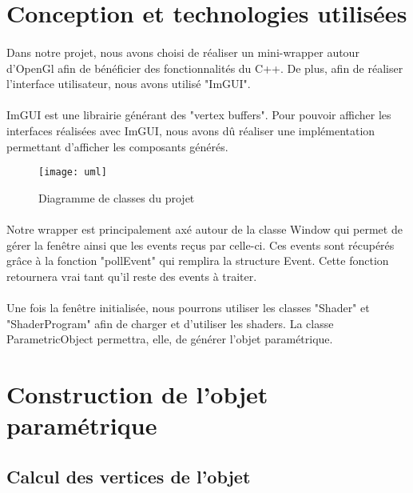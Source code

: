 \documentclass[article, backcover, french, nodocumentinfo]{upmethodology-document}
\begin{document}
	\section{Conception et technologies utilisées}
		\paragraph*{}
			Dans notre projet, nous avons choisi de réaliser un mini-wrapper autour d'OpenGl afin de bénéficier des fonctionnalités du C++.
			De plus, afin de réaliser l'interface utilisateur, nous avons utilisé "ImGUI".
		\paragraph*{}
			ImGUI est une librairie générant des "vertex buffers".
			Pour pouvoir afficher les interfaces réalisées avec ImGUI, nous avons dû réaliser une implémentation permettant d'afficher les composants générés.

			\begin{figure}[H]
				\centering%
				\texttt{[image: uml]}
				\caption{Diagramme de classes du projet}
				\label{fig:uml}
			\end{figure}

		\paragraph*{}
			Notre wrapper est principalement axé autour de la classe Window qui permet de gérer la fenêtre ainsi que les events reçus par celle-ci.
			Ces events sont récupérés grâce à la fonction "pollEvent" qui remplira la structure Event. Cette fonction retournera vrai tant qu'il reste des events à traiter.
		\paragraph*{}
			Une fois la fenêtre initialisée, nous pourrons utiliser les classes "Shader" et "ShaderProgram" afin de charger et d'utiliser les shaders.
			La classe ParametricObject permettra, elle, de générer l'objet paramétrique.

	\section{Construction de l'objet paramétrique}
	\subsection{Calcul des vertices de l'objet}
\end{document}
